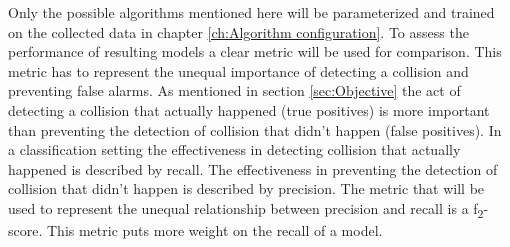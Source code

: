 Only the possible algorithms mentioned here will be parameterized and trained on the  collected data in chapter \ref{ch:Algorithm configuration}.   \newline
To assess the performance of resulting models a clear metric will be used for comparison. This metric has to represent the unequal importance of detecting a collision and preventing false alarms. As mentioned in section \ref{sec:Objective} the act of detecting a collision that actually happened (true positives) is more important than preventing the detection of collision that didn't happen (false positives). In a classification setting the effectiveness in detecting collision that actually happened is described by recall. The effectiveness in preventing the detection of collision that didn't happen is described by precision. The metric that will be used to represent the unequal relationship between precision and recall is a f\textsubscript{2}-score. This metric puts more weight on the recall of a model.

